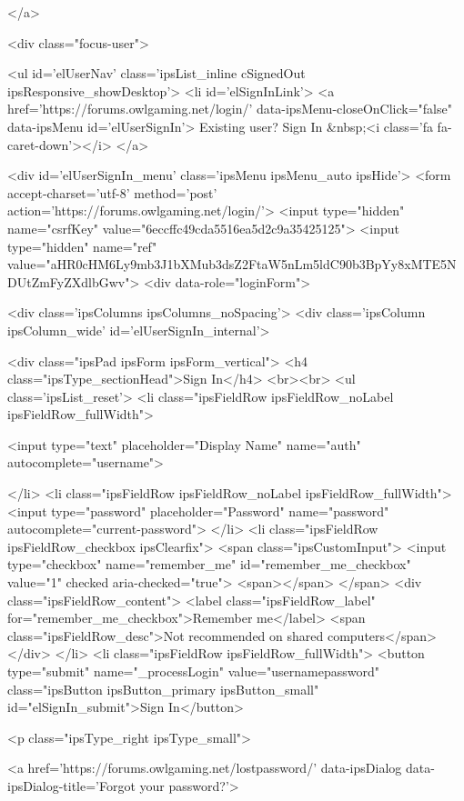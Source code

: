 	
</a>
									
										<div class="focus-user">

	<ul id='elUserNav' class='ipsList_inline cSignedOut ipsResponsive_showDesktop'>
		<li id='elSignInLink'>
			<a href='https://forums.owlgaming.net/login/' data-ipsMenu-closeOnClick="false" data-ipsMenu id='elUserSignIn'>
				Existing user? Sign In &nbsp;<i class='fa fa-caret-down'></i>
			</a>
			
<div id='elUserSignIn_menu' class='ipsMenu ipsMenu_auto ipsHide'>
	<form accept-charset='utf-8' method='post' action='https://forums.owlgaming.net/login/'>
		<input type="hidden" name="csrfKey" value="6eccffc49cda5516ea5d2c9a35425125">
		<input type="hidden" name="ref" value="aHR0cHM6Ly9mb3J1bXMub3dsZ2FtaW5nLm5ldC90b3BpYy8xMTE5NDUtZmFyZXdlbGwv">
		<div data-role="loginForm">
			
			
			
				<div class='ipsColumns ipsColumns_noSpacing'>
					<div class='ipsColumn ipsColumn_wide' id='elUserSignIn_internal'>
						
<div class="ipsPad ipsForm ipsForm_vertical">
	<h4 class="ipsType_sectionHead">Sign In</h4>
	<br><br>
	<ul class='ipsList_reset'>
		<li class="ipsFieldRow ipsFieldRow_noLabel ipsFieldRow_fullWidth">
			
			
				<input type="text" placeholder="Display Name" name="auth" autocomplete="username">
			
		</li>
		<li class="ipsFieldRow ipsFieldRow_noLabel ipsFieldRow_fullWidth">
			<input type="password" placeholder="Password" name="password" autocomplete="current-password">
		</li>
		<li class="ipsFieldRow ipsFieldRow_checkbox ipsClearfix">
			<span class="ipsCustomInput">
				<input type="checkbox" name="remember_me" id="remember_me_checkbox" value="1" checked aria-checked="true">
				<span></span>
			</span>
			<div class="ipsFieldRow_content">
				<label class="ipsFieldRow_label" for="remember_me_checkbox">Remember me</label>
				<span class="ipsFieldRow_desc">Not recommended on shared computers</span>
			</div>
		</li>
		<li class="ipsFieldRow ipsFieldRow_fullWidth">
			<button type="submit" name="_processLogin" value="usernamepassword" class="ipsButton ipsButton_primary ipsButton_small" id="elSignIn_submit">Sign In</button>
			
				<p class="ipsType_right ipsType_small">
					
						<a href='https://forums.owlgaming.net/lostpassword/' data-ipsDialog data-ipsDialog-title='Forgot your password?'>
					
